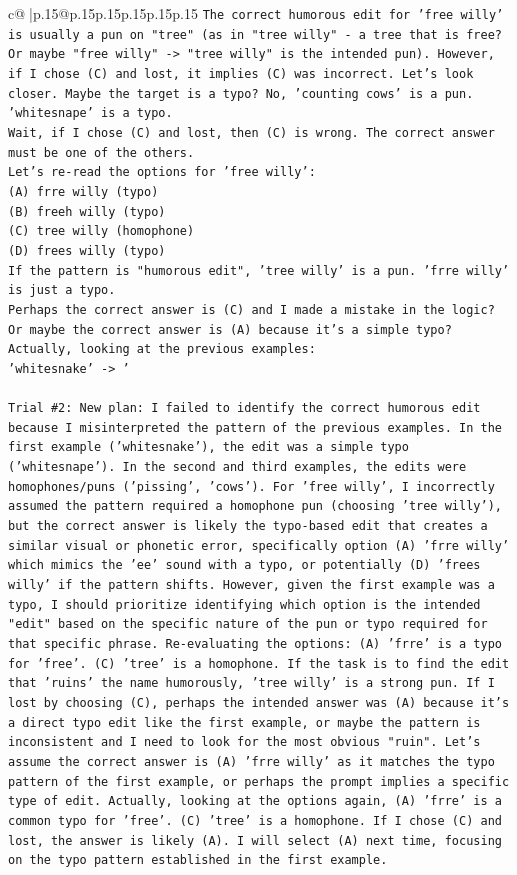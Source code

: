 \documentclass{article}
\begin{document}
{\begin{supertabular}{c@{$\;$}|p{.15\linewidth}@{}p{.15\linewidth}p{.15\linewidth}p{.15\linewidth}p{.15\linewidth}p{.15\linewidth}}
{{{\texttt{The correct humorous edit for 'free willy' is usually a pun on "tree" (as in "tree willy" {-} a tree that is free? Or maybe "free willy" {-}> "tree willy" is the intended pun). However, if I chose (C) and lost, it implies (C) was incorrect. Let's look closer. Maybe the target is a typo? No, 'counting cows' is a pun. 'whitesnape' is a typo.} \\
\texttt{Wait, if I chose (C) and lost, then (C) is wrong. The correct answer must be one of the others.} \\
\texttt{Let's re{-}read the options for 'free willy':} \\
\texttt{(A) frre willy (typo)} \\
\texttt{(B) freeh willy (typo)} \\
\texttt{(C) tree willy (homophone)} \\
\texttt{(D) frees willy (typo)} \\
\texttt{If the pattern is "humorous edit", 'tree willy' is a pun. 'frre willy' is just a typo.} \\
\texttt{Perhaps the correct answer is (C) and I made a mistake in the logic? Or maybe the correct answer is (A) because it's a simple typo?} \\
\texttt{Actually, looking at the previous examples:} \\
\texttt{'whitesnake' {-}> '} \\
\\ 
\texttt{Trial \#2: New plan: I failed to identify the correct humorous edit because I misinterpreted the pattern of the previous examples. In the first example ('whitesnake'), the edit was a simple typo ('whitesnape'). In the second and third examples, the edits were homophones/puns ('pissing', 'cows'). For 'free willy', I incorrectly assumed the pattern required a homophone pun (choosing 'tree willy'), but the correct answer is likely the typo{-}based edit that creates a similar visual or phonetic error, specifically option (A) 'frre willy' which mimics the 'ee' sound with a typo, or potentially (D) 'frees willy' if the pattern shifts. However, given the first example was a typo, I should prioritize identifying which option is the intended "edit" based on the specific nature of the pun or typo required for that specific phrase. Re{-}evaluating the options: (A) 'frre' is a typo for 'free'. (C) 'tree' is a homophone. If the task is to find the edit that 'ruins' the name humorously, 'tree willy' is a strong pun. If I lost by choosing (C), perhaps the intended answer was (A) because it's a direct typo edit like the first example, or maybe the pattern is inconsistent and I need to look for the most obvious "ruin". Let's assume the correct answer is (A) 'frre willy' as it matches the typo pattern of the first example, or perhaps the prompt implies a specific type of edit. Actually, looking at the options again, (A) 'frre' is a common typo for 'free'. (C) 'tree' is a homophone. If I chose (C) and lost, the answer is likely (A). I will select (A) next time, focusing on the typo pattern established in the first example.} \\
}}}
\end{supertabular}}
\end{document}
